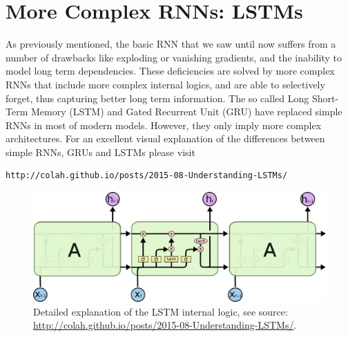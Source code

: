 \section{More Complex RNNs: LSTMs}

As previously mentioned, the basic RNN that we saw until now suffers from a
number of drawbacks like exploding or vanishing gradients, and the inability to
model long term dependencies. These deficiencies are solved by more complex
RNNs that include more complex internal logics, and are able to selectively
forget, thus capturing better long term information. The so called Long Short-Term Memory
(LSTM) and Gated Recurrent Unit (GRU) have replaced simple RNNs in most of modern
models. However, they only imply more complex architectures. For an excellent 
visual explanation of the differences between simple RNNs, GRUs and LSTMs please visit 

\begin{verbatim}
http://colah.github.io/posts/2015-08-Understanding-LSTMs/
\end{verbatim}

\begin{figure}[!h]
\centering
\includegraphics[scale=0.6]{figs/deep_learning/LSTM3-chain.png}
\caption{Detailed explanation of the LSTM internal logic, see source: \url{http://colah.github.io/posts/2015-08-Understanding-LSTMs/}.}
\label{fig:LSTM}
\end{figure}

